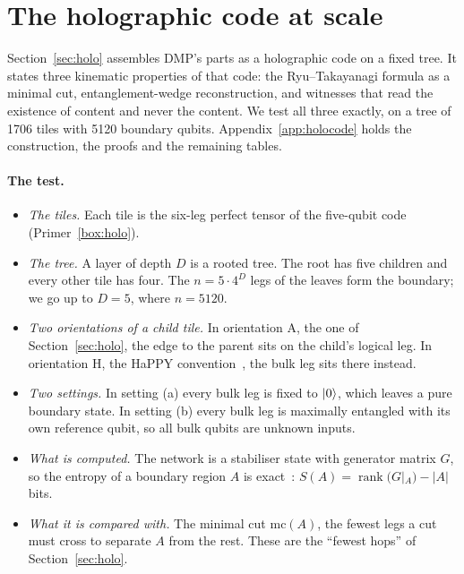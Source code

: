 \section{The holographic code at scale}\label{sec:holocode}

Section~\ref{sec:holo} assembles DMP's parts as a holographic code on a fixed tree. It states three kinematic properties of that code:
the Ryu--Takayanagi formula as a minimal cut, entanglement-wedge reconstruction, and witnesses that read the existence of content and
never the content. We test all three exactly, on a tree of 1706 tiles with 5120 boundary qubits. Appendix~\ref{app:holocode} holds
the construction, the proofs and the remaining tables.

\paragraph{The test.}
\begin{itemize}[nosep]
\item \emph{The tiles.} Each tile is the six-leg perfect tensor of the five-qubit code~\cite{laflamme,happy}
  (Primer~\ref{box:holo}).
\item \emph{The tree.} A layer of depth $D$ is a rooted tree. The root has five children and every other tile has four. The $n=5\cdot4^D$
  legs of the leaves form the boundary; we go up to $D=5$, where $n=5120$.
\item \emph{Two orientations of a child tile.} In orientation A, the one of Section~\ref{sec:holo}, the edge to the parent sits on the
  child's logical leg. In orientation H, the HaPPY convention~\cite{happy}, the bulk leg sits there instead.
\item \emph{Two settings.} In setting (a) every bulk leg is fixed to $\lvert 0\rangle$, which leaves a pure boundary state. In setting (b) every
  bulk leg is maximally entangled with its own reference qubit, so all bulk qubits are unknown inputs.
\item \emph{What is computed.} The network is a stabiliser state with generator matrix $G$, so the entropy of a boundary region $A$ is
  exact~\cite{fattal2004}: $S(A)=\operatorname{rank}(G|_A)-|A|$ bits.
\item \emph{What it is compared with.} The minimal cut $\mathrm{mc}(A)$, the fewest legs a cut must cross to separate $A$ from the rest.
  These are the ``fewest hops'' of Section~\ref{sec:holo}.
\end{itemize}

